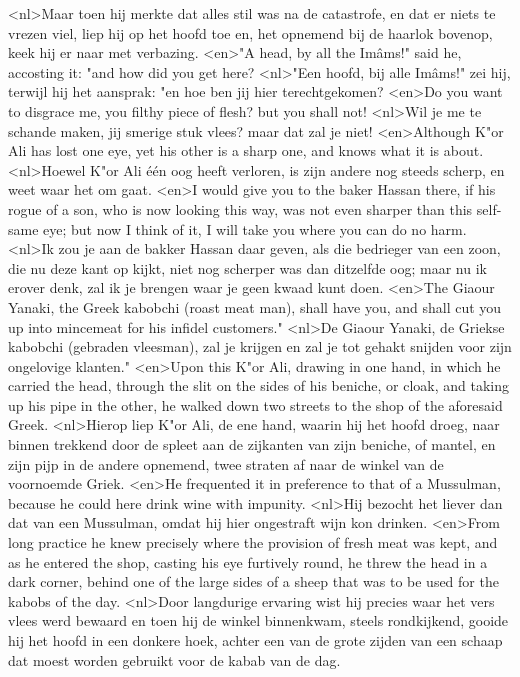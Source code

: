 <nl>Maar toen hij merkte dat alles stil was na de catastrofe, en dat er niets te vrezen viel, liep hij op het hoofd toe en,  het opnemend bij de haarlok bovenop, keek hij er  naar met verbazing.
<en>"A head, by all the Imâms!" said he, accosting it: "and how did you get here?
<nl>"Een hoofd, bij alle Imâms!" zei hij, terwijl hij het aansprak: "en hoe ben jij hier terechtgekomen?
<en>Do you want to disgrace me, you filthy piece of flesh? but you shall not!
<nl>Wil je me te schande maken, jij smerige stuk vlees? maar dat zal je niet!
<en>Although K"or Ali has lost one eye, yet his other is a sharp one, and knows what it is about.
<nl>Hoewel K"or Ali één oog heeft verloren, is zijn andere nog steeds scherp, en weet waar  het om gaat.
<en>I would give you to the baker Hassan there, if his rogue of a son, who is now looking this way, was not even sharper than this self-same eye; but now I think of it, I will take you where you can do no harm.
<nl>Ik zou je aan de bakker Hassan daar geven, als die bedrieger van een zoon, die nu deze kant op kijkt, niet nog scherper was dan ditzelfde oog; maar nu ik erover denk, zal ik je brengen waar je geen kwaad kunt doen.
<en>The Giaour Yanaki, the Greek kabobchi (roast meat man), shall have you, and shall cut you up into mincemeat for his infidel customers."
<nl>De Giaour Yanaki, de Griekse kabobchi (gebraden vleesman), zal je krijgen en zal je tot gehakt snijden voor zijn ongelovige klanten."
<en>Upon this K"or Ali, drawing in one hand, in which he carried the head, through the slit on the sides of his beniche, or cloak, and taking up his pipe in the other, he walked down two streets to the shop of the aforesaid Greek.
<nl>Hierop liep K"or Ali, de ene hand, waarin hij het hoofd droeg, naar binnen trekkend door de spleet aan de zijkanten van zijn beniche, of mantel, en zijn pijp in de andere opnemend, twee straten af naar de winkel van de voornoemde Griek.
<en>He frequented it in preference to that of a Mussulman, because he could here drink wine with impunity.
<nl>Hij bezocht het liever dan dat van een Mussulman, omdat hij hier ongestraft wijn kon drinken.
<en>From long practice he knew precisely where the provision of fresh meat was kept, and as he entered the shop, casting his eye furtively round, he threw the head in a dark corner, behind one of the large sides of a sheep that was to be used for the kabobs of the day.
<nl>Door langdurige ervaring wist hij precies waar het vers vlees werd bewaard en toen hij de winkel binnenkwam, steels rondkijkend, gooide hij het hoofd in een donkere hoek, achter een van de grote zijden van een schaap dat moest worden gebruikt voor de kabab van de dag.
